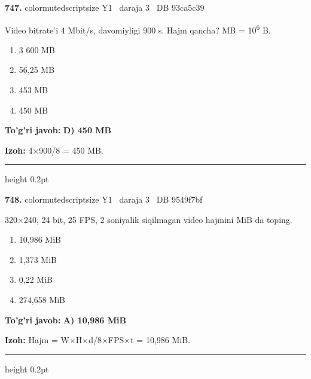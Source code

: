 \documentclass[10pt,a4paper,oneside]{article}
\begin{document}
\noindent\textbf{\color{ink}747.}  {color{muted}scriptsize Y1 \textbullet\ daraja 3 \textbullet\ DB 93ca5c39}
\par
Video bitrate'i 4 Mbit/s, davomiyligi 900 s. Hajm qancha? MB = 10\textsuperscript{6} B.
\begin{enumerate}[label=\Alph*),leftmargin=9mm]
\item 3 600 MB
\item 56,25 MB
\item 453 MB
\item 450 MB
\end{enumerate}
\begin{tcolorbox}[enhanced,breakable,colback=teal!4,colframe=teal!50!black,boxrule=0.5pt,arc=1.1mm,left=3mm,right=3mm,top=1.7mm,bottom=1.7mm,before skip=2mm,after skip=2mm]
\textbf{\color{teal}To'g'ri javob:} \textbf{D) 450 MB}
\par\smallskip
\textbf{Izoh:} 4\ensuremath{\times}900/8 = 450 MB.
\end{tcolorbox}
\vspace{2mm}\hrule height 0.2pt \vspace{3mm}

\noindent\textbf{\color{ink}748.}  {color{muted}scriptsize Y1 \textbullet\ daraja 3 \textbullet\ DB 9549f7bf}
\par
320\ensuremath{\times}240, 24 bit, 25 FPS, 2 soniyalik siqilmagan video hajmini MiB da toping.
\begin{enumerate}[label=\Alph*),leftmargin=9mm]
\item 10,986 MiB
\item 1,373 MiB
\item 0,22 MiB
\item 274,658 MiB
\end{enumerate}
\begin{tcolorbox}[enhanced,breakable,colback=teal!4,colframe=teal!50!black,boxrule=0.5pt,arc=1.1mm,left=3mm,right=3mm,top=1.7mm,bottom=1.7mm,before skip=2mm,after skip=2mm]
\textbf{\color{teal}To'g'ri javob:} \textbf{A) 10,986 MiB}
\par\smallskip
\textbf{Izoh:} Hajm = W\ensuremath{\times}H\ensuremath{\times}d/8\ensuremath{\times}FPS\ensuremath{\times}t = 10,986 MiB.
\end{tcolorbox}
\vspace{2mm}\hrule height 0.2pt \vspace{3mm}
\end{document}
